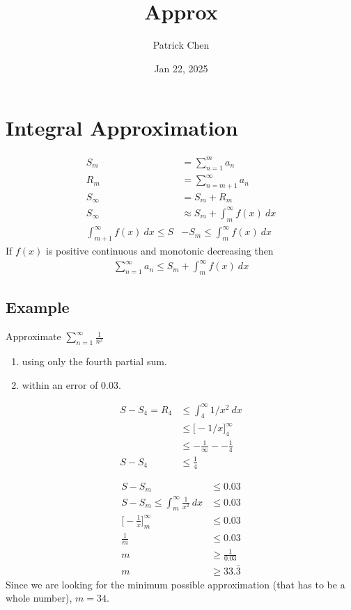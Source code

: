 \documentclass{article}
\title{Approx}
\author{Patrick Chen}
\date{Jan 22, 2025}
\theoremstyle{mytheoremstyle}
\theoremstyle{mytheoremstyle}
\theoremstyle{myproblemstyle}
\begin{document}
    \maketitle
    \section*{Integral Approximation}
    \begin{align*}
        S_m &= \sum_{n=1}^{m} a_n \\
        R_m &= \sum_{n=m+1}^{\infty} a_n \\
        S_\infty &= S_m + R_m \\
        S_\infty &\approx S_m + \int_{m}^{\infty} f(x) \ dx \\
        \int_{m+1}^{\infty} f(x) \ dx \le S&-S_m \le \int_{m}^{\infty} f(x) \ dx
    \end{align*}
    If $f(x)$ is positive continuous and monotonic decreasing then
    \begin{align*}
        \sum_{n=1}^{\infty} a_n \le S_m + \int_{m}^{\infty} f(x) \ dx
    \end{align*}

    \subsection*{Example}
    Approximate $\sum_{n=1}^{\infty} \frac{1}{n^2}$
    \begin{enumerate}
        \item using only the fourth partial sum.
        \item within an error of 0.03.
    \end{enumerate}

    \begin{align*}
        S-S_4 = R_4 &\le \int_{4}^{\infty} 1/x^2 \ dx \\
        &\le \Big[-1/x\Big]_4^{\infty} \\
        &\le -\frac{1}{\infty} - -\frac{1}{4} \\
        S-S_4&\le \frac{1}{4}
    \end{align*}

    \begin{align*}
        S-S_m &\le 0.03 \\
        S-S_m \le \int_{m}^{\infty} \frac{1}{x^2} \ dx &\le 0.03 \\
        \Big[-\frac{1}{x} \Big]_m^\infty &\le 0.03 \\
        \frac{1}{m} &\le 0.03 \\
        m &\ge \frac{1}{0.03} \\
        m &\ge 33.\bar{3}
    \end{align*}
    Since we are looking for the minimum possible approximation (that
    has to be a whole number), $m=34$.
\end{document}
